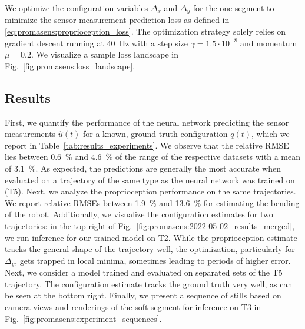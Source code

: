 We optimize the configuration variables $\Delta_x$ and $\Delta_y$ for the one segment to minimize the sensor measurement prediction loss as defined in \eqref{eq:promasens:proprioception_loss}.
The optimization strategy solely relies on gradient descent running at \SI{40}{Hz} %
with a step size $\gamma = 1.5 \cdot 10^{-8}$ and momentum $\mu = 0.2$. %
We visualize a sample loss landscape in Fig.~\ref{fig:promasens:loss_landscape}.

\subsection{Results}\label{sub:promasens:experimental_results}
First, we quantify the performance of the neural network predicting the sensor measurements $\hat{u}(t)$ for a known, ground-truth configuration $q(t)$, which we report in Table~\ref{tab:results_experiments}.
We observe that the relative \gls{RMSE} lies between \SI{0.6}{\percent} and \SI{4.6}{\percent} of the range of the respective datasets with a mean of \SI{3.1}{\percent}.
As expected, the predictions are generally the most accurate when evaluated on a trajectory of the same type as the neural network was trained on (T5).
% 
Next, we analyze the proprioception performance on the same trajectories.
We report relative RMSEs between \SI{1.9}{\percent} and \SI{13.6}{\percent} for estimating the bending of the robot.
Additionally, we visualize the configuration estimates for two trajectories: in the top-right of Fig.~\ref{fig:promasens:2022-05-02_results_merged}, we run inference for our trained model on T2. While the proprioception estimate tracks the general shape of the trajectory well, the optimization, particularly for $\Delta_y$, gets trapped in local minima, sometimes leading to periods of higher error.
Next, we consider a model trained and evaluated on separated sets of the T5 trajectory. The configuration estimate tracks the ground truth very well, as can be seen at the bottom right.
Finally, we present a sequence of stills based on camera views and renderings of the soft segment for inference on T3 in Fig.~\ref{fig:promasens:experiment_sequences}.

